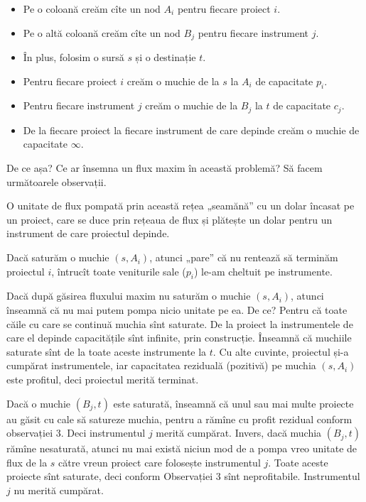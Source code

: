 \documentclass[../main.tex]{subfiles}
\begin{document}
\begin{itemize}
  \item Pe o coloană creăm cîte un nod $A_i$ pentru fiecare proiect $i$.

  \item Pe o altă coloană creăm cîte un nod $B_j$ pentru fiecare instrument $j$.

  \item În plus, folosim o sursă $s$ și o destinație $t$.

  \item Pentru fiecare proiect $i$ creăm o muchie de la $s$ la $A_i$ de capacitate $p_i$.

  \item Pentru fiecare instrument $j$ creăm o muchie de la $B_j$ la $t$ de capacitate $c_j$.

  \item De la fiecare proiect la fiecare instrument de care depinde creăm o muchie de capacitate $\infty$.
\end{itemize}

De ce așa? Ce ar însemna un flux maxim în această problemă? Să facem următoarele observații.

\begin{remark}
  O unitate de flux pompată prin această rețea „seamănă” cu un dolar încasat pe un proiect, care se duce prin rețeaua de flux și plătește un dolar pentru un instrument de care proiectul depinde.
\end{remark}

\begin{remark}
  Dacă saturăm o muchie $(s, A_i)$, atunci „pare” că nu rentează să terminăm proiectul $i$, întrucît toate veniturile sale ($p_i$) le-am cheltuit pe instrumente.
\end{remark}

\begin{remark}
  Dacă după găsirea fluxului maxim nu saturăm o muchie $(s, A_i)$, atunci înseamnă că nu mai putem pompa nicio unitate pe ea. De ce? Pentru că toate căile cu care se continuă muchia sînt saturate. De la proiect la instrumentele de care el depinde capacitățile sînt infinite, prin construcție. Înseamnă că muchiile saturate sînt de la toate aceste instrumente la $t$. Cu alte cuvinte, proiectul și-a cumpărat instrumentele, iar capacitatea reziduală (pozitivă) pe muchia $(s, A_i)$ este profitul, deci proiectul merită terminat.
\end{remark}

\begin{remark}
  Dacă o muchie $(B_j, t)$ este saturată, înseamnă că unul sau mai multe proiecte au găsit cu cale să satureze muchia, pentru a rămîne cu profit rezidual conform observației 3. Deci instrumentul $j$ merită cumpărat. Invers, dacă muchia $(B_j, t)$ rămîne nesaturată, atunci nu mai există niciun mod de a pompa vreo unitate de flux de la $s$ către vreun proiect care folosește instrumentul $j$. Toate aceste proiecte sînt saturate, deci conform Observației 3 sînt neprofitabile. Instrumentul $j$ nu merită cumpărat.
\end{remark}
\end{document}
